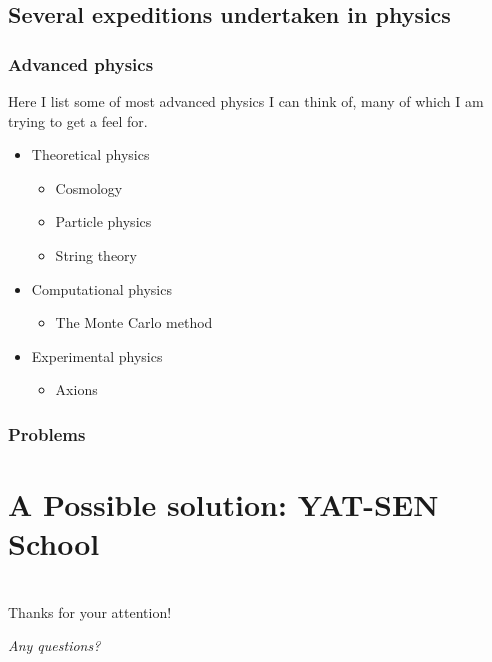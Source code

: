 \documentclass{beamer}
\begin{document}
\subsection{Several expeditions undertaken in physics}
\begin{frame}
  \frametitle{Advanced physics}
  Here I list some of most advanced physics I can think of, many of
  which I am trying to get a feel for. 
  \begin{itemize}
  \item<1-> Theoretical physics \pause
    \begin{itemize}
    \item Cosmology
    \item Particle physics
    \item String theory
    \end{itemize}
  \item<3-> Computational physics \pause
    \begin{itemize}
    \item The Monte Carlo method
    \end{itemize}
  \item<5-> Experimental physics
    \begin{itemize}
    \item Axions
    \end{itemize}
  \end{itemize} 
    
\end{frame}


\begin{frame}
  \frametitle{Problems}
  
\end{frame}




\section{A Possible solution: YAT-SEN School}






\section{}
\begin{frame}
  \begin{center}
    \Huge{\alert{Thanks for your attention!}}\par
    \Huge{\textit{Any questions?}}
  \end{center}
  
\end{frame}
\end{document}
